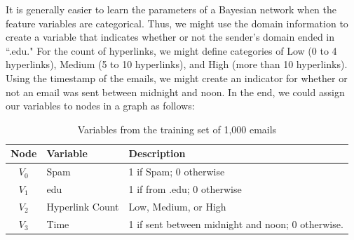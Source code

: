 \documentclass[12pt,twoside]{reedthesis}
\begin{document}
	It is generally easier to learn the parameters of a Bayesian network when the feature variables are categorical. Thus, we might use the domain information to create a variable that indicates whether or not the sender's domain ended in ``.edu." For the count of hyperlinks, we might define categories of Low (0 to 4 hyperlinks), Medium (5 to 10 hyperlinks), and High (more than 10 hyperlinks). Using the timestamp of the emails, we might create an indicator for whether or not an email was sent between midnight and noon. In the end, we could assign our variables to nodes in a graph as follows:

\begin{table}[htdp] %
\caption[Example Training Data for Na\"{i}ve Bayes Classification]{Variables from the training set of 1,000 emails} 
\begin{center} 
\begin{tabular}{c | l l} 
\toprule %
  Node &  Variable & Description  \\ %
  \midrule %
 $V_0$ & Spam & 1 if Spam; 0 otherwise \\ %
 $V_1$ & edu & 1 if from .edu; 0 otherwise \\
 $V_2$ & Hyperlink Count & Low, Medium, or High \\
 $V_3$ & Time & 1 if sent between midnight and noon; 0 otherwise.  \\
\bottomrule %
\end{tabular}
\end{center}
\label{inheritance} %
\end{table}
	
\end{document}
